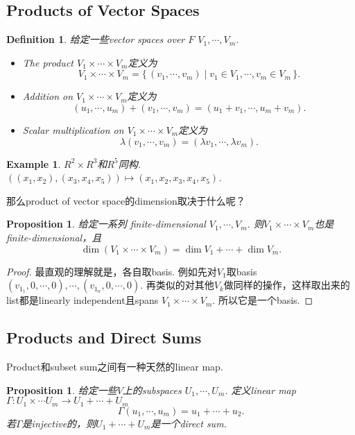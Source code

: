 \documentclass{article}
\newtheorem{proposition}[theorem]{Proposition}
\newtheorem{example}[theorem]{Example}
\newtheorem{definition}[theorem]{Definition}
\newcommand*{\xfunc}[4]{{#2}\colon{#3}{#1}{#4}}
\newcommand*{\func}[3]{\xfunc{\to}{#1}{#2}{#3}}
\newcommand\Set[2]{\{\,#1\mid#2\,\}} %
\begin{document}
\newpage
\subsection{Products of Vector Spaces}

\begin{definition}
\rm 给定一些vector spaces over $F$ $V_1,\cdots,V_m$.
\begin{itemize}
	\item The product $V_1 \times \cdots \times V_m$定义为
	$$
		V_1 \times \cdots \times V_m  = \Set{(v_1,\cdots,v_m)}{v_1 \in V_1, \cdots, v_m \in V_m}.
	$$
	\item Addition on $V_1 \times \cdots \times V_m$定义为
	$$
		(u_1,\cdots,u_m) + (v_1,\cdots,v_m) = (u_1+v_1,\cdots,u_m + v_m).
	$$
	\item Scalar multiplication on $V_1 \times \cdots \times V_m$定义为
	$$
		\lambda(v_1,\cdots,v_m) = (\lambda v_1,\cdots,\lambda v_m).
	$$
\end{itemize}
\end{definition}

\begin{example}
$R^2 \times R^3$和$R^5$同构. $((x_1,x_2) ,(x_3,x_4,x_5)) \mapsto (x_1,x_2,x_3,x_4,x_5)$.
\end{example}

{\color{red} 那么product of vector space的dimension取决于什么呢}？

\begin{proposition}
\rm 给定一系列 finite-dimensional $V_1,\cdots,V_m$. 则$V_1 \times \cdots \times V_m$也是finite-dimensional，且
$$
	\dim(V_1 \times \cdots \times V_m)=\dim V_1 + \cdots + \dim V_m.
$$
\end{proposition}

\begin{proof}
最直观的理解就是，各自取basis. 例如先对$V_1$取basis $(v_{1_1},0,\cdots,0) , \cdots,(v_{1_n},0,\cdots,0)$. 再类似的对其他$V_k$做同样的操作，这样取出来的list都是linearly independent且spans $V_1 \times \cdots \times V_m$. 所以它是一个basis. 
\end{proof}

\newpage
\subsection{Products and Direct Sums}

Product和subset sum之间有一种天然的linear map.

\begin{proposition}
\rm 给定一些$V$上的subspaces $U_1,\cdots,U_m$. 定义linear map $\func{\Gamma}{U_1 \times \cdots U_m}{U_1 + \cdots + U_m}$
$$
 \Gamma(u_1,\cdots,u_m) = u_1 + \cdots + u_2. 
$$
若$\Gamma$是injective的，则$U_1 + \cdots + U_m$是一个direct sum.
\end{proposition}
\end{document}
